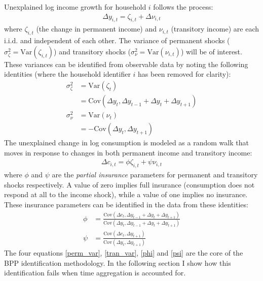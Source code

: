 \documentclass[AER]{AEA}
\begin{document}
Unexplained log income growth for household $i$ follows the process:
\begin{align*}
\Delta y_{i,t} = \zeta_{i,t} + \Delta \nu_{i,t}
\end{align*}
where $\zeta_{i,t}$ (the change in permanent income) and $\nu_{i,t}$ (transitory income) are each i.i.d. and independent of each other. The variance of permanent shocks ($\sigma^2_{\zeta}=\mathrm{Var}(\zeta_{i,t})$) and transitory shocks ($\sigma^2_{\nu}=\mathrm{Var}(\nu_{i,t})$) will be of interest. These variances can be identified from observable data by noting the following identities (where the household identifier $i$ has been removed for clarity):
\begin{align}
\sigma^2_{\zeta}&=\mathrm{Var}(\zeta_{t}) \nonumber \\
&= \mathrm{Cov}(\Delta y_{t}, \Delta y_{t-1}+\Delta y_{t}+\Delta y_{t+1}) \label{perm_var}\\
\sigma^2_{\nu}&=\mathrm{Var}(\nu_{t}) \nonumber \\
&= -\mathrm{Cov}(\Delta y_{t},\Delta y_{t+1}) \label{tran_var}
\end{align}
The unexplained change in log consumption is modeled as a random walk that moves in response to changes in both permanent income and transitory income:
\begin{align*}
\Delta c_{i,t} = \phi \zeta_{i,t} + \psi \nu_{i,t} 
\end{align*}
where $\phi$ and $\psi$ are the \textit{partial insurance} parameters for permanent and transitory shocks respectively. A value of zero implies full insurance (consumption does not respond at all to the income shock), while a value of one implies no insurance. These insurance parameters can be identified in the data from these identities:
\begin{align}
\phi&= \frac{\mathrm{Cov}(\Delta c_{t}, \Delta y_{t-1}+\Delta y_{t}+\Delta y_{t+1})}{\mathrm{Cov}(\Delta y_{t}, \Delta y_{t-1}+\Delta y_{t}+\Delta y_{t+1})} \label{phi}\\
\psi&= \frac{\mathrm{Cov}(\Delta c_{t},\Delta y_{t+1})}{\mathrm{Cov}(\Delta y_{t},\Delta y_{t+1})} \label{psi}
\end{align}
The four equations \ref{perm_var}, \ref{tran_var}, \ref{phi} and \ref{psi} are the core of the BPP identification methodology. In the following section I show how this identification fails when time aggregation is accounted for.
\end{document}
